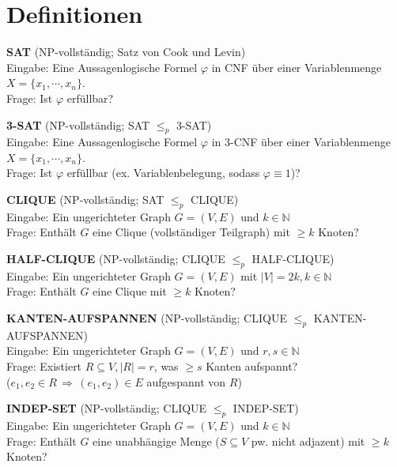 \documentclass[a4paper,graphics,11pt]{article}
\begin{document}
\section*{Definitionen}

\textbf{SAT} (\textsf{NP}-vollständig; Satz von Cook und Levin)
\\[5pt]
Eingabe: Eine Aussagenlogische Formel $\varphi$ in CNF über einer Variablenmenge $X = \{x_1,\cdots,x_n\}$.
\\[5pt]
Frage: Ist $\varphi$ erfüllbar?

\strut

\textbf{3-SAT} (\textsf{NP}-vollständig; SAT $\leq_p$ 3-SAT)
\\[5pt]
Eingabe: Eine Aussagenlogische Formel $\varphi$ in 3-CNF über einer Variablenmenge $X = \{x_1,\cdots,x_n\}$.
\\[5pt]
Frage: Ist $\varphi$ erfüllbar (ex. Variablenbelegung, sodass $\varphi \equiv 1$)?

\strut

\textbf{CLIQUE} (\textsf{NP}-vollständig; SAT $\leq_p$ CLIQUE)
\\[5pt]
Eingabe: Ein ungerichteter Graph $G = (V,E)$ und $k \in \mathbb{N}$
\\[5pt]
Frage: Enthält $G$ eine Clique (vollständiger Teilgraph) mit $\geq k$ Knoten?

\strut

\textbf{HALF-CLIQUE} (\textsf{NP}-vollständig; CLIQUE $\leq_p$ HALF-CLIQUE)
\\[5pt]
Eingabe: Ein ungerichteter Graph $G = (V,E)$ mit $|V| = 2k, k \in \mathbb{N}$
\\[5pt]
Frage: Enthält $G$ eine Clique mit $\geq k$ Knoten?

\strut

\textbf{KANTEN-AUFSPANNEN} (\textsf{NP}-vollständig; CLIQUE $\leq_p$ KANTEN-AUFSPANNEN)
\\[5pt]
Eingabe: Ein ungerichteter Graph $G = (V,E)$ und $r,s \in \mathbb{N}$
\\[5pt]
Frage: Existiert $R \subseteq V, |R| = r$, was $\geq s$ Kanten aufspannt?\\
($e_1,e_2 \in R \,\Longrightarrow\, (e_1,e_2) \in E$ aufgespannt von $R$)

\strut

\textbf{INDEP-SET} (\textsf{NP}-vollständig; CLIQUE $\leq_p$ INDEP-SET)
\\[5pt]
Eingabe: Ein ungerichteter Graph $G = (V,E)$ und $k \in \mathbb{N}$
\\[5pt]
Frage: Enthält $G$ eine unabhängige Menge ($S \subseteq V$ pw. nicht adjazent) mit $\geq k$ Knoten?
\end{document}
